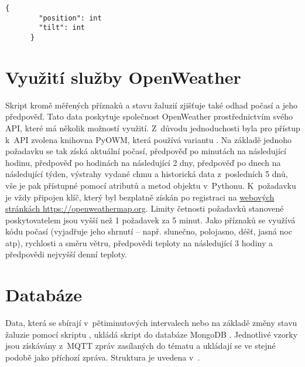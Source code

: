     \begin{lstlisting}[caption={[Struktura zprávy o~stavu žaluzie]Struktura zprávy o~stavu žaluzie, která je všem klientům zasílána každých 15~s. \code{position} označuje výšku vytažení žaluzie (0 -- zavřeno, 100 -- otevřeno), obdobně hodnota \code{tilt} vyjadřuje naklopení lamel.},captionpos=b,label=lst:wsMsg]
      {
        "position": int
        "tilt": int
      }
    \end{lstlisting}

  \section{Využití služby OpenWeather} \label{sec:owm}
    Skript  kromě měřených příznaků a stavu žaluzií zjišťuje také odhad počasí a jeho předpověď. Tato data poskytuje společnost OpenWeather prostřednictvím svého API, které má několik možností využití. Z~důvodu jednoduchosti byla pro přístup k~API zvolena knihovna PyOWM, která používá variantu . Na základě jednoho požadavku se tak získá aktuální počasí, předpověď po minutách na následující hodinu, předpověď po hodinách na následující 2 dny, předpověď po dnech na následující týden, výstrahy vydané \acrshort{chmu} a historická data z~posledních 5 dnů, vše je pak přístupné pomocí atributů a metod objektu v~Pythonu. K~požadavku je vždy připojen klíč, který byl bezplatně získán po registraci na \href{https://openweathermap.org}{webových stránkách https://openweathermap.org}. Limity četnosti požadavků stanovené poskytovatelem jsou vyšší než 1 požadavek za 5 minut. Jako příznaků se využívá kódu počasí (vyjadřuje jeho shrnutí -- např. slunečno, polojasno, déšť, jasná noc \acrshort{atp}), rychlosti a směru větru, předpovědi teploty na následující 3 hodiny a předpovědi nejvyšší denní teploty.

  \section{Databáze}\label{sec:db}
    Data, která se sbírají v~pětiminutových intervalech nebo na základě změny stavu žaluzie pomocí skriptu , ukládá skript  do databáze MongoDB \cite{mongodb:mongodb}. Jednotlivé vzorky jsou získávány z~MQTT zpráv zasílaných do tématu  a ukládají se ve stejné podobě jako příchozí zpráva. Struktura je uvedena v~.

